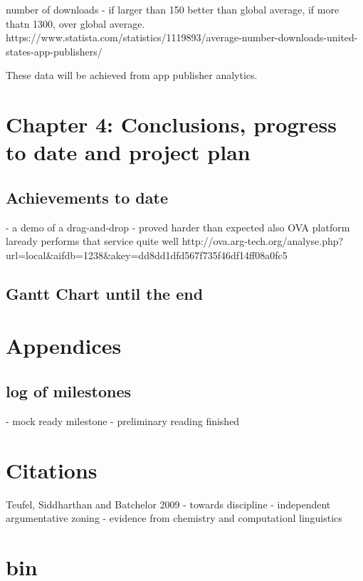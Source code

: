 \documentclass{article}
\begin{document}
number of downloads - if larger than 150 better than global average, if more thatn 1300, over global average.
https://www.statista.com/statistics/1119893/average-number-downloads-united-states-app-publishers/

These data will be achieved from app publisher analytics.

\section{Chapter 4: Conclusions, progress to date and project plan}
\subsection{Achievements to date}
- a demo of a drag-and-drop - proved harder than expected
also OVA platform laready performs that service quite well
http://ova.arg-tech.org/analyse.php?url=local&aifdb=1238&akey=dd8dd1dfd567f735f46df14ff08a0fc5

\subsection{Gantt Chart until the end}

\section{Appendices}
\subsection{log of milestones}
- mock ready milestone 
- preliminary reading finished

\section{Citations}


Teufel, Siddharthan and Batchelor  2009 - towards discipline - independent argumentative zoning - evidence from chemistry and computationl linguistics
\newpage

\section{bin}
\end{document}
